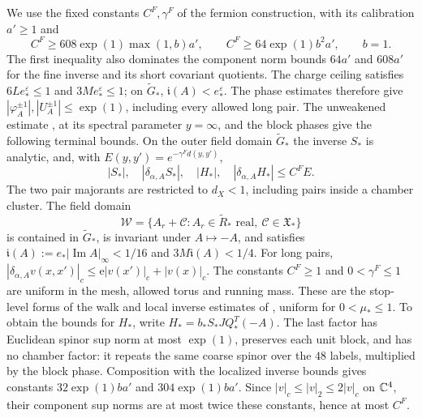 We use the fixed constants $C^F,\gamma^F$
of the fermion construction, with its calibration
$a'\ge1$ and
\[
 C^F\ge608\exp(1)\max(1,b)a',
 \qquad C^F\ge64\exp(1)b^2a',\qquad b=1.
\]
The first inequality also dominates the component
norm bounds $64a'$ and $608a'$ for the fine
inverse and its short covariant quotients.
The charge ceiling satisfies
$6Le_*^\varepsilon\le1$ and
$3Me_*^\varepsilon\le1$; on $\widetilde G_*$,
$\mathfrak i(A)<e_*^\varepsilon$. The phase
estimates therefore give
$|\varphi_A^{\pm1}|,|U_A^{\pm1}|\le\exp(1)$,
including every allowed long pair.
The unweakened estimate
\cite[(43)]{FermionBlock}, at its
spectral parameter $y=\infty$, and the block
phases give the following terminal bounds.
On the outer field domain $\widetilde G_*$ the inverse
$S_*$ is analytic, and, with
$E(y,y')=e^{-\gamma^Fd(y,y')}$,
\begin{equation}\label{eq:interacting-terminal-input}
 |S_*|,\quad|\delta_{\alpha,A}S_*|,\quad
 |H_*|,\quad|\delta_{\alpha,A}H_*|
                                  \le C^FE.
\end{equation}
The two pair majorants are restricted to $d_X<1$,
including pairs inside a chamber cluster.
The field domain
\[
 \mathcal W=\{A_r+\mathscr C:
          A_r\in\widetilde R_*\text{ real},\
          \mathscr C\in\mathfrak X_*\}
\]
is contained in $\widetilde G_*$, is invariant under
$A\mapsto-A$, and satisfies
$\mathfrak i(A):=e_*|\operatorname{Im}A|_\infty<1/16$
and $3M\mathfrak i(A)<1/4$. For long pairs,
$|\delta_{\alpha,A}v(x,x')|_c
\le\mathrm e|v(x')|_c+|v(x)|_c$.
The constants $C^F\ge1$ and $0<\gamma^F\le1$ are
uniform in the mesh, allowed torus and running mass. These
are the stop-level forms of the walk and local inverse estimates
of \cite[\S3]{FermionBlock}, uniform for $0<\mu_*\le1$. To obtain the bounds
for $H_*$, write
$H_*=b_*S_*JQ_*^T(-A)$. The last factor has
Euclidean spinor sup norm at most $\exp(1)$,
preserves each unit block, and has no chamber
factor: it repeats the same coarse spinor over
the $48$ labels, multiplied by the block phase.
Composition with the localized inverse bounds
gives constants $32\exp(1)ba'$ and
$304\exp(1)ba'$. Since
$|v|_c\le|v|_2\le2|v|_c$ on $\mathbb C^4$,
their component sup norms are at most twice
these constants, hence at most $C^F$.

